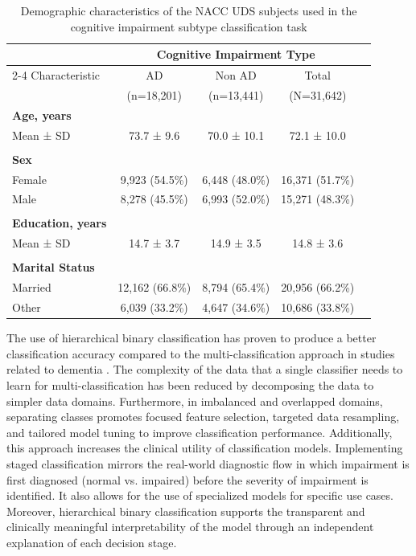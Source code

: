 \begin{table}[htbp]
\centering
\caption{Demographic characteristics of the NACC UDS subjects used in the cognitive impairment subtype classification task}
\label{table:ci-type-demographics}
\footnotesize
\begin{tabular}{lcccc}
\toprule
 & \multicolumn{3}{c}{Cognitive Impairment Type} & \\
\cmidrule{2-4}
Characteristic & AD & Non AD & Total \\
 & (n=18,201) & (n=13,441) & (N=31,642) \\
\midrule
\textbf{Age, years} \\
\quad Mean ± SD & 73.7 ± 9.6 & 70.0 ± 10.1 & 72.1 ± 10.0 \\
\\
\textbf{Sex} \\
\quad Female & 9,923 (54.5\%) & 6,448 (48.0\%) & 16,371 (51.7\%) \\
\quad Male & 8,278 (45.5\%) & 6,993 (52.0\%) & 15,271 (48.3\%) \\
\\
\textbf{Education, years} \\
\quad Mean ± SD & 14.7 ± 3.7 & 14.9 ± 3.5 & 14.8 ± 3.6 \\
\\
\textbf{Marital Status} \\
\quad Married & 12,162 (66.8\%) & 8,794 (65.4\%) & 20,956 (66.2\%) \\
\quad Other & 6,039 (33.2\%) & 4,647 (34.6\%) & 10,686 (33.8\%) \\
\bottomrule
\end{tabular}
\end{table}

The use of hierarchical binary classification has proven to produce a better classification accuracy compared to the multi-classification approach in studies related to dementia \cite{Ren2023Improving}. The complexity of the data that a single classifier needs to learn for multi-classification has been reduced by decomposing the data to simpler data domains. Furthermore, in imbalanced and overlapped domains, separating classes promotes focused feature selection, targeted data resampling, and tailored model tuning to improve classification performance. Additionally, this approach increases the clinical utility of classification models. Implementing staged classification mirrors the real-world diagnostic flow in which impairment is first diagnosed (normal vs. impaired) before the severity of impairment is identified. It also allows for the use of specialized models for specific use cases. Moreover, hierarchical binary classification supports the transparent and clinically meaningful interpretability of the model through an independent explanation of each decision stage.

